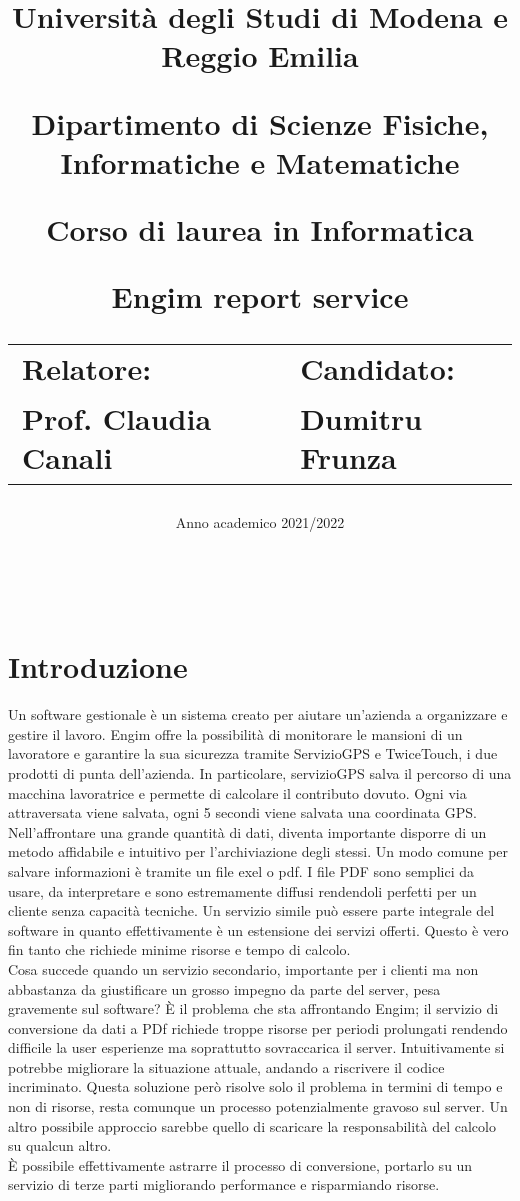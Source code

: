 \documentclass[12pt]{article}
\author{}
\title{
    \huge 
        \textbf{Università degli Studi di Modena e Reggio Emilia}
    \large
        \par Dipartimento di Scienze Fisiche, Informatiche e Matematiche
        \par Corso di laurea in Informatica
    \vfil
        \huge \par \textbf{Engim report service}
    \vfil
    \normalsize
    \begin{tabular}{lp{0.4\textwidth}l}
      Relatore: & & Candidato: \\
      Prof. Claudia Canali & &  Dumitru Frunza \\
      \end{tabular}
}
\date{Anno academico 2021/2022}
\begin{document}
\maketitle
\thispagestyle{empty}
\newpage 
\thispagestyle{empty}
\
\newpage
{}
\addtocounter{page}{0}
\listoffigures
\newpage
{}
\tableofcontents
{}
\newpage
{}
\addtocounter{page}{0}


\section*{Introduzione}
Un software gestionale è un sistema creato per aiutare un'azienda a organizzare 
e gestire il lavoro.
Engim offre la possibilità di monitorare le mansioni di un lavoratore e garantire 
la sua sicurezza tramite  ServizioGPS e TwiceTouch, i due prodotti di punta dell'azienda. 
In particolare, servizioGPS salva il percorso di una macchina lavoratrice e 
permette di calcolare il contributo dovuto. Ogni via attraversata viene salvata, 
ogni 5 secondi viene salvata una coordinata GPS.
\\ Nell'affrontare una grande quantità di dati, diventa importante
 disporre di un metodo affidabile e intuitivo per l'archiviazione degli stessi.
Un modo comune per salvare informazioni è tramite un file exel o pdf.
I file PDF sono semplici da usare, da interpretare e sono estremamente diffusi 
rendendoli perfetti per un cliente senza capacità tecniche. 
Un servizio simile può essere parte integrale del software in quanto effettivamente 
è un estensione dei servizi offerti. 
Questo è vero fin tanto che richiede minime risorse e tempo di calcolo.
\\ Cosa succede quando un servizio secondario, importante per i clienti ma non 
abbastanza da giustificare un grosso impegno da parte del server, pesa gravemente 
sul software? 
È il problema che sta affrontando Engim; il servizio di conversione da dati 
a PDf richiede troppe risorse per periodi prolungati rendendo difficile la user 
esperienze ma soprattutto sovraccarica il server.
Intuitivamente si potrebbe migliorare la situazione attuale, andando a riscrivere 
il codice incriminato.
Questa soluzione però risolve solo il problema in termini di tempo e non di 
risorse, resta comunque un processo potenzialmente gravoso sul server. 
Un altro possibile approccio sarebbe quello di scaricare la responsabilità del 
calcolo su qualcun altro.
\\ È possibile effettivamente astrarre il processo di conversione, portarlo su 
un servizio di terze parti migliorando performance e risparmiando risorse.
\end{document}
